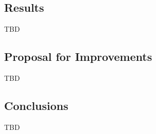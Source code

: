 \documentclass{article}
\begin{document}
\subsection{Results}
TBD

\subsection{Proposal for Improvements}
TBD

\subsection{Conclusions}
TBD



\end{document}
